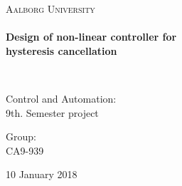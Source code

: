 %

\thispagestyle{empty}

\begin{center}

\vspace*{\fill}

\textsc{\LARGE Aalborg University}\\[1.0cm]

\HRule \\[0.4cm]
{ \HUGE \bfseries Design of non-linear controller for \\ hysteresis cancellation%
\\[0.5cm] } %

\HRule \\[1.5cm]%


\begin{minipage}{0.4\textwidth}
\begin{flushleft} \large
Control and Automation:\\
9th. Semester project
\end{flushleft}
\end{minipage}
\begin{minipage}{0.4\textwidth}
\begin{flushright} \large
Group: \\
CA9-939
\end{flushright}
\end{minipage}

\vspace*{\fill}


{\large 10 January 2018}

\end{center}

